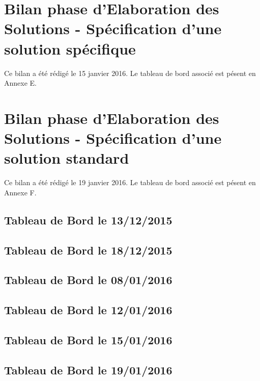 \setcounter{section}{0}


\part{Bilan phase d'Elaboration des Solutions - Spécification d'une solution spécifique}

Ce bilan a été rédigé le 15 janvier 2016. Le tableau de bord associé est pésent en Annexe E.

\setcounter{section}{0}


\part{Bilan phase d'Elaboration des Solutions - Spécification d'une solution standard}

Ce bilan a été rédigé le 19 janvier 2016. Le tableau de bord associé est pésent en Annexe F.

\setcounter{section}{0}



\begin{appendices}

\chapter{Tableau de Bord le 13/12/2015}


\chapter{Tableau de Bord le 18/12/2015}


\chapter{Tableau de Bord le 08/01/2016}


\chapter{Tableau de Bord le 12/01/2016}


\chapter{Tableau de Bord le 15/01/2016}


\chapter{Tableau de Bord le 19/01/2016}


\end{appendices}


